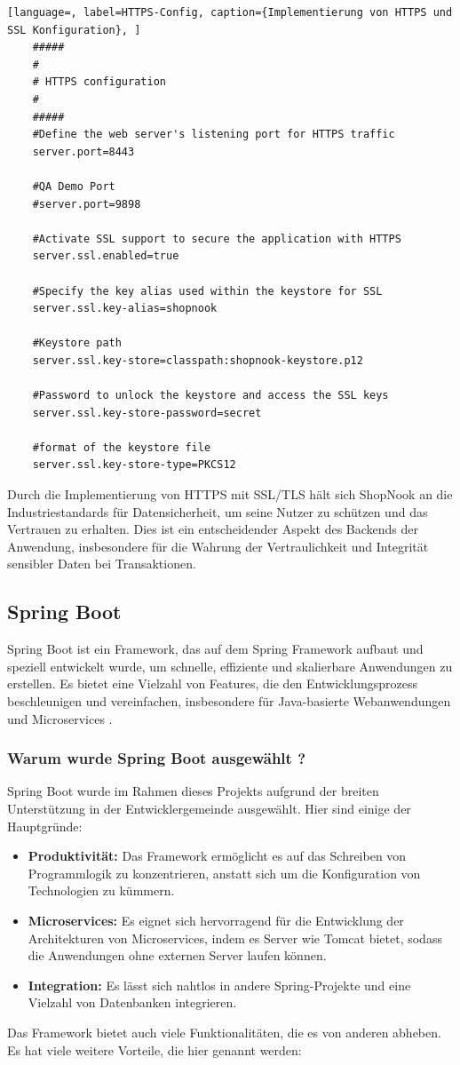 \begin{lstlisting}[language=, label=HTTPS-Config, caption={Implementierung von HTTPS und SSL Konfiguration}, ]
	#####
	#
	# HTTPS configuration
	#
	#####
	#Define the web server's listening port for HTTPS traffic
	server.port=8443 
	
	#QA Demo Port
	#server.port=9898
	
	#Activate SSL support to secure the application with HTTPS
	server.ssl.enabled=true
	
	#Specify the key alias used within the keystore for SSL
	server.ssl.key-alias=shopnook
	
	#Keystore path
	server.ssl.key-store=classpath:shopnook-keystore.p12
	
	#Password to unlock the keystore and access the SSL keys
	server.ssl.key-store-password=secret
	
	#format of the keystore file
	server.ssl.key-store-type=PKCS12
\end{lstlisting}



Durch die Implementierung von HTTPS mit SSL/TLS hält sich ShopNook an die Industriestandards für Datensicherheit, um seine Nutzer zu schützen und das Vertrauen zu erhalten. Dies ist ein entscheidender Aspekt des Backends der Anwendung, insbesondere für die Wahrung der Vertraulichkeit und Integrität sensibler Daten bei Transaktionen.

\subsection{Spring Boot}

Spring Boot ist ein Framework, das auf dem Spring Framework aufbaut und speziell entwickelt wurde, um schnelle, effiziente und skalierbare Anwendungen zu erstellen. Es bietet eine Vielzahl von Features, die den Entwicklungsprozess beschleunigen und vereinfachen, insbesondere für Java-basierte Webanwendungen und Microservices \cite{Spring-Framework:o.J}.

\subsubsection{Warum wurde Spring Boot ausgewählt ?}
Spring Boot wurde im Rahmen dieses Projekts aufgrund der breiten Unterstützung in der Entwicklergemeinde ausgewählt. Hier sind einige der Hauptgründe:
\begin{itemize}
	\item \textbf{Produktivität:} Das Framework ermöglicht es auf das Schreiben von Programmlogik zu konzentrieren, anstatt sich um die Konfiguration von Technologien zu kümmern.
	\item \textbf{Microservices:} Es eignet sich hervorragend für die Entwicklung der Architekturen von Microservices, indem es Server wie Tomcat bietet, sodass die Anwendungen ohne externen Server laufen können.
	\item \textbf{Integration:} Es lässt sich nahtlos in andere Spring-Projekte und eine Vielzahl von Datenbanken integrieren.
\end{itemize}
Das Framework bietet auch viele Funktionalitäten, die es von anderen abheben. Es hat viele weitere Vorteile, die hier genannt werden:

